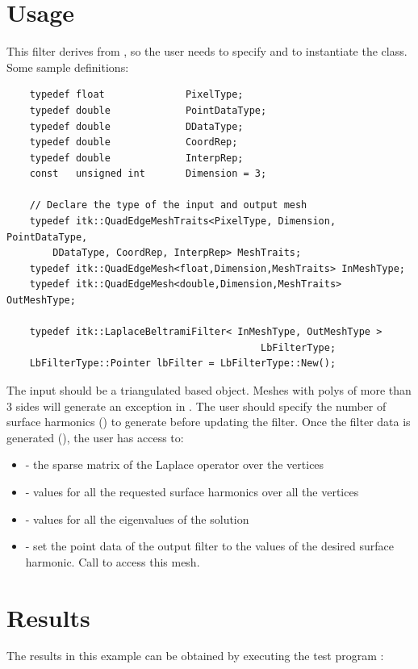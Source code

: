 \documentclass{InsightArticle}
\begin{document}
\section{Usage}
This filter derives from , so the user
needs to specify  and  to instantiate the
class.  Some sample definitions:
\small
\begin{verbatim}
    typedef float              PixelType;
    typedef double             PointDataType;
    typedef double             DDataType;
    typedef double             CoordRep;
    typedef double             InterpRep;
    const   unsigned int       Dimension = 3;

    // Declare the type of the input and output mesh
    typedef itk::QuadEdgeMeshTraits<PixelType, Dimension, PointDataType,
        DDataType, CoordRep, InterpRep> MeshTraits;
    typedef itk::QuadEdgeMesh<float,Dimension,MeshTraits> InMeshType;
    typedef itk::QuadEdgeMesh<double,Dimension,MeshTraits> OutMeshType;

    typedef itk::LaplaceBeltramiFilter< InMeshType, OutMeshType >
                                            LbFilterType;
    LbFilterType::Pointer lbFilter = LbFilterType::New();

\end{verbatim}
\normalsize
The input should be a triangulated  based object.
Meshes with polys of
more than 3 sides will generate an exception in .
The user should specify the
number of surface harmonics () 
to generate before updating the filter.
Once the filter data is generated (), the user has
access to:
\begin{itemize}
\item {} - the sparse matrix of the Laplace operator over
the vertices
\item {} - values for all the requested surface harmonics
over all the vertices
\item {} - values for all the eigenvalues of the solution
\item {} - set the point data of the output filter to
the values of the desired surface harmonic.  Call  to access
this mesh.
\end{itemize}

\section{Results}
The results in this example can be obtained by executing the test program
:
\end{document}
